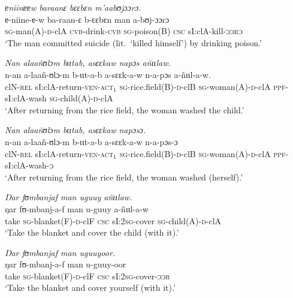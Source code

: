 \documentclass[output=paper]{langscibook}
\begin{document}
    \ex\label{ex:Creissels:20b}
    
      \textit{ɐniinɐɐw baraanɛ bɛɛbɛn m'aabʊjɔɔrɔ.}\\
      \gll ɐ-niine-ɐ-w ba-raan-ɛ b-ɛɛbɛn man a-bʊj-ɔɔrɔ\\
      \textsc{sg}-man(A)-\textsc{d}-clA \textsc{cvb}-drink-\textsc{cvb} \textsc{sg}-poison(B) \textsc{csc} sI:clA-kill-\textsc{ɔɔrɔ}\\
      \glt `The man committed suicide (lit.\ `killed himself') by drinking poison.'

  \z
  \z

  \ea\label{ex:Creissels:21}
  
    \ea\label{ex:Creissels:21a}
      \textit{Nan alaañʊlɔm bɩɩtab, asɛɛkaw napɔs añɩɩlaw.}\\
      \gll n-an a-laañ-ʊlɔ-m b-ɩɩt-a-b a-sɛɛk-a-w n-a-pɔs a-ñɩɩl-a-w.\\
      clN-\textsc{rel} sI:clA-return-\textsc{ven-act$_1$} \textsc{sg}-rice.field(B)-\textsc{d}-clB \textsc{sg}-woman(A)-\textsc{d}-clA \textsc{ppf}-sI:clA-wash \textsc{sg}-child(A)-\textsc{d}-clA \\
      \glt `After returning from the rice field, the woman washed the child.'


    \ex\label{ex:Creissels:21b}
      \textit{Nan alaañʊlɔm bɩɩtab, asɛɛkaw napɔsɔ.}\\
      \gll n-an a-laañ-ʊlɔ-m b-ɩɩt-a-b a-sɛɛk-a-w n-a-pɔs-ɔ\\
      clN-\textsc{rel} sI:clA-return-\textsc{ven-act$_1$} \textsc{sg}-rice.field(B)-\textsc{d}-clB \textsc{sg}-woman(A)-\textsc{d}-clA \textsc{ppf}-sI:clA-wash-\textsc{ɔ}\\
      \glt `After returning from the rice field, the woman washed (herself).'

  \z
  \z

  \ea\label{ex:Creissels:22}
 
    \ea\label{ex:Creissels:22a}
      \textit{Ŋar fʊmbanjaf man uguuy añɩɩlaw.}\\
      \gll ŋar fʊ-mbanj-a-f man u-guuy a-ñɩɩl-a-w\\
      take \textsc{sg}-blanket(F)-\textsc{d}-clF \textsc{csc} sI:\textsc{2sg}-cover \textsc{sg}-child(A)-\textsc{d}-clA\\
      \glt `Take the blanket and cover the child (with it).'


    \ex\label{ex:Creissels:22b}
    
      \textit{Ŋar fʊmbanjaf man uguuyoor.}\\
      \gll ŋar fʊ-mbanj-a-f man u-guuy-oor\\
      take \textsc{sg}-blanket(F)-\textsc{d}-clF \textsc{csc} sI:\textsc{2sg}-cover-\textsc{ɔɔr}\\
      \glt `Take the blanket and cover yourself (with it).'
\end{document}
